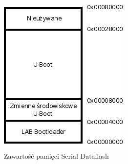 \documentclass[a4paper,12pt]{book}
\begin{document}
			\begin{figure}[]
				\begin{center}
					\includegraphics[scale=0.6]{img/bootloader_map.jpg}
					\caption{Zawartość pamięci Serial Dataflash}
					\label{fig:bootloader_map}
				\end{center}
			\end{figure}
\end{document}

